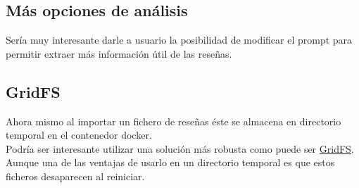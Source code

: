 \subsection{Más opciones de análisis}
Sería muy interesante darle a usuario la posibilidad de modificar el prompt para permitir 
extraer más información útil de las reseñas.

\subsection{GridFS}
Ahora mismo al importar un fichero de reseñas éste se almacena en directorio temporal en el contenedor docker.\\
Podría ser interesante utilizar una solución más robusta como puede ser \href{https://www.mongodb.com/docs/manual/core/gridfs/}{GridFS}. 
Aunque una de las ventajas de usarlo en un directorio temporal es que estos ficheros desaparecen al reiniciar.
